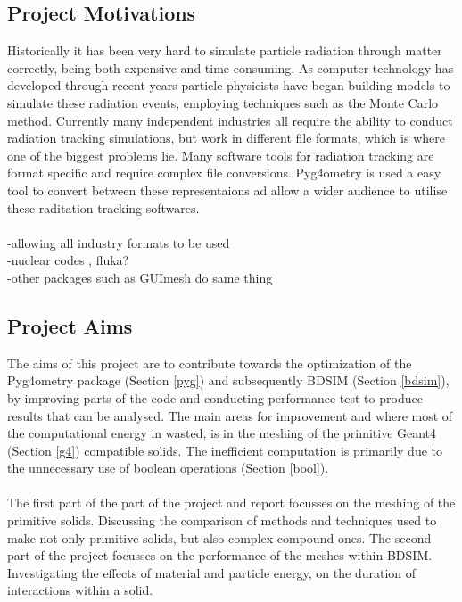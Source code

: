 \documentclass[12pt,a4paper]{article}
\begin{document}
\subsection{Project Motivations}
\label{motiv}
\noindent Historically it has been very hard to simulate particle radiation through matter correctly, being both expensive and time consuming. As computer technology has developed through recent years particle physicists have began building models to simulate these radiation events, employing techniques such as the Monte Carlo method. Currently many independent industries all require the ability to conduct radiation tracking simulations, but work in different file formats, which is where one of the biggest problems lie. Many software tools for radiation tracking are format specific and require complex file conversions. Pyg4ometry is used a easy tool to convert between these representaions ad allow a wider audience to utilise these raditation tracking softwares.
\\\\
-allowing all industry formats to be used\\
-nuclear codes , fluka?\\
-other packages such as GUImesh do same thing\\

\subsection{Project Aims}
\label{aim}
The aims of this project are to contribute towards the optimization of the Pyg4ometry package (Section \ref{pyg}) and subsequently BDSIM (Section \ref{bdsim}), by improving parts of the code and conducting performance test to produce results that can be analysed. The main areas for improvement and where most of the computational energy in wasted, is in the meshing of the primitive Geant4 (Section \ref{g4}) compatible solids. The inefficient computation is primarily due to the unnecessary use of boolean operations (Section \ref{bool}).
\\\\
The first part of the part of the project and report focusses on the meshing of the primitive solids. Discussing the comparison of methods and techniques used to make not only primitive solids, but also complex compound ones. The second part of the project focusses on the performance of the meshes within BDSIM. Investigating the effects of material and particle energy, on the duration of interactions within a solid.
\end{document}
